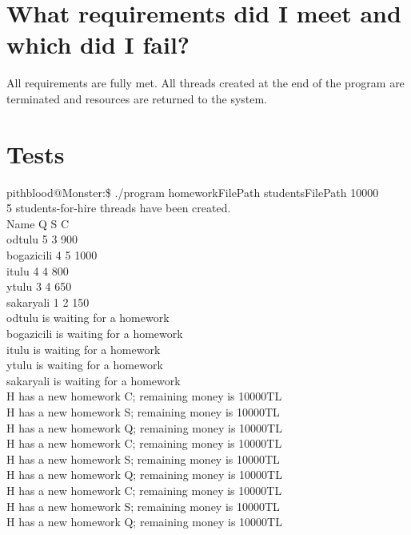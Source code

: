 \documentclass{article}
\begin{document}
\section{What requirements did I meet and which did I fail?}
\quad All requirements are fully met. All threads created at the end of the program are terminated and resources are returned to the system.\\


\section{Tests}

\quad pithblood@Monster:\$ ./program homeworkFilePath studentsFilePath 10000\\
5 students-for-hire threads have been created.\\
        Name             Q       S       C\\
odtulu                   5       3       900\\
bogazicili               4       5       1000\\
itulu                    4       4       800\\
ytulu                    3       4       650\\
sakaryali                1       2       150\\
odtulu is waiting for a homework\\
bogazicili is waiting for a homework\\
itulu is waiting for a homework\\
ytulu is waiting for a homework\\
sakaryali is waiting for a homework\\
H has a new homework C; remaining money is 10000TL\\
H has a new homework S; remaining money is 10000TL\\
H has a new homework Q; remaining money is 10000TL\\
H has a new homework C; remaining money is 10000TL\\
H has a new homework S; remaining money is 10000TL\\
H has a new homework Q; remaining money is 10000TL\\
H has a new homework C; remaining money is 10000TL\\
H has a new homework S; remaining money is 10000TL\\
H has a new homework Q; remaining money is 10000TL\\
\end{document}
